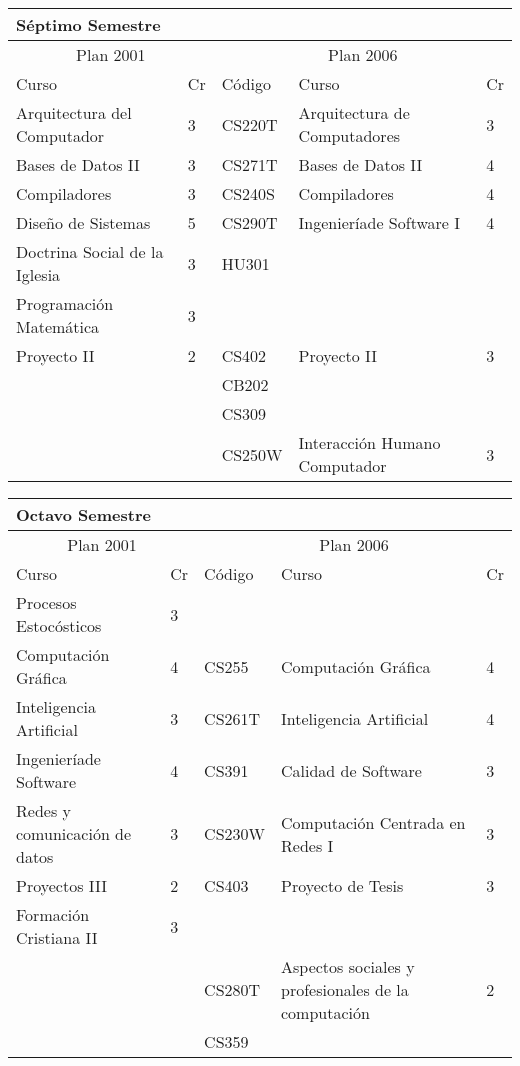 \begin{center}
\begin{tabularx}{0.95\textwidth}{|p{4cm}|p{1cm}||p{2cm}|X|p{1cm}|}\hline
\multicolumn{5}{|l|}{\textbf{Séptimo Semestre}} \\ \hline
\multicolumn{2}{|c|}{Plan 2001} & \multicolumn{3}{|c|}{Plan 2006} \\ \hline
Curso & Cr & Código & Curso & Cr \\ \hline
Arquitectura del Computador & 3 & CS220T & Arquitectura de Computadores & 3 \\ \hline
Bases de Datos II & 3 & CS271T & Bases de Datos II & 4 \\ \hline
Compiladores & 3 & CS240S & Compiladores & 4 \\ \hline
Diseño de Sistemas & 5 & CS290T & Ingenieríade Software I & 4 \\ \hline
Doctrina Social de la Iglesia & 3 & HU301 &  & \\ \hline
Programación Matemática & 3 &  &  & \\ \hline
Proyecto II & 2 & CS402 & Proyecto II & 3 \\ \hline
 &  & CB202 &  & \\ \hline
 &  & CS309 &  & \\ \hline
 &  & CS250W & Interacción Humano Computador & 3 \\ \hline
\end{tabularx}
\end{center}

\begin{center}
\begin{tabularx}{0.95\textwidth}{|p{4cm}|p{1cm}||p{2cm}|X|p{1cm}|}\hline
\multicolumn{5}{|l|}{\textbf{Octavo Semestre}} \\ \hline
\multicolumn{2}{|c|}{Plan 2001} & \multicolumn{3}{|c|}{Plan 2006} \\ \hline
Curso & Cr & Código & Curso & Cr \\ \hline
Procesos Estocósticos & 3 &  &  & \\ \hline
Computación Gráfica & 4 & CS255 & Computación Gráfica & 4 \\ \hline
Inteligencia Artificial & 3 & CS261T & Inteligencia Artificial & 4 \\ \hline
Ingenieríade Software & 4 & CS391 & Calidad de Software & 3 \\ \hline
Redes y comunicación de datos & 3 & CS230W & Computación Centrada en Redes I & 3 \\ \hline
Proyectos III & 2 & CS403 & Proyecto de Tesis & 3 \\ \hline
Formación Cristiana II & 3 &  &  & \\ \hline
 &  & CS280T & Aspectos sociales y profesionales de la computación& 2 \\ \hline
 &  & CS359 &  & \\ \hline
\end{tabularx}
\end{center}

